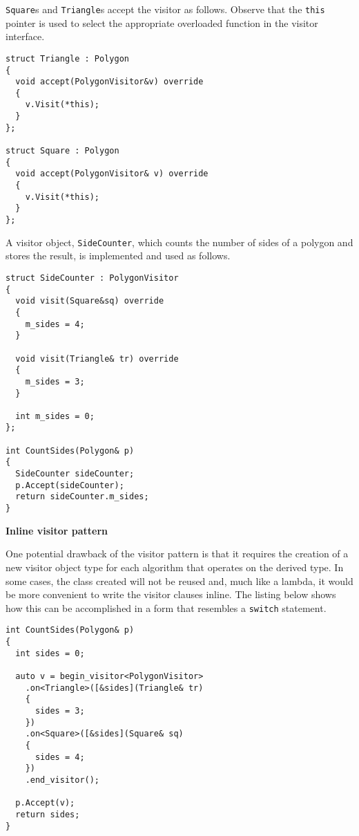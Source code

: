 \documentclass[10pt,a4paper,twocolumn]{article}
\renewcommand\section[1]{
    \begin{minipage}[c]{0.94\linewidth}
    \large \raggedright \sffamily \textbf{#1}
    \end{minipage}
}
\newcommand\mycode[1]{{\small\texttt{#1}}}
\begin{document}
\mycode{Square}s and \mycode{Triangle}s accept the visitor as follows. Observe
that the \mycode{this} pointer is used to select the appropriate overloaded
function in the visitor interface.

{\small\begin{verbatim} 
struct Triangle : Polygon 
{ 
  void accept(PolygonVisitor&v) override 
  { 
    v.Visit(*this); 
  } 
};

struct Square : Polygon 
{ 
  void accept(PolygonVisitor& v) override 
  {
    v.Visit(*this); 
  } 
};\end{verbatim}}

A visitor object, \mycode{SideCounter}, which counts the number of sides of a
polygon and stores the result, is implemented and used as follows.

{\small\begin{verbatim} 
struct SideCounter : PolygonVisitor 
{ 
  void visit(Square&sq) override 
  { 
    m_sides = 4; 
  }
  
  void visit(Triangle& tr) override 
  { 
    m_sides = 3; 
  }
  
  int m_sides = 0; 
};

int CountSides(Polygon& p) 
{ 
  SideCounter sideCounter; 
  p.Accept(sideCounter);
  return sideCounter.m_sides; 
}\end{verbatim}}

\section{Inline visitor pattern}

One potential drawback of the visitor pattern is that it requires the creation
of a new visitor object type for each algorithm that operates on the derived
type. In some cases, the class created will not be reused and, much like a
lambda, it would be more convenient to write the visitor clauses inline. The
listing below shows how this can be accomplished in a form that resembles a
\mycode{switch} statement.

{\small\begin{verbatim} 
int CountSides(Polygon& p) 
{ 
  int sides = 0;
  
  auto v = begin_visitor<PolygonVisitor> 
    .on<Triangle>([&sides](Triangle& tr) 
    {
      sides = 3; 
    }) 
    .on<Square>([&sides](Square& sq) 
    { 
      sides = 4; 
    }) 
    .end_visitor();
  
  p.Accept(v); 
  return sides; 
} \end{verbatim}}
\end{document}

